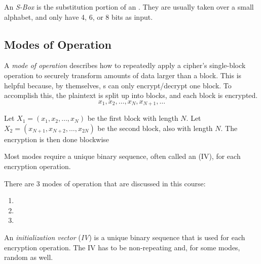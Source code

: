 \begin{definition}[S-Box]\label{def:S_Box}
  An \emph{S-Box} is the substitution portion of an .
  They are usually taken over a small alphabet, and only have 4, 6, or 8 bits as input.
\end{definition}

\subsection{Modes of Operation}\label{subsec:Modes_of_Operation}
\begin{definition}\label{def:Mode_of_Operation}
  A \emph{mode of operation} describes how to repeatedly apply a cipher's single-block operation to securely transform amounts of data larger than a block.
  This is helpful because, by themselves, s can only encrypt/decrypt one block.
  To accomplish this, the plaintext is split up into blocks, and each block is encrypted.
  \begin{equation*}
    x_{1}, x_{2}, \ldots, x_{N}, x_{N+1}, \ldots
  \end{equation*}

  Let $X_{1} = (x_{1}, x_{2}, \ldots, x_{N})$ be the first block with length $N$.
  Let $X_{2} = (x_{N+1}, x_{N+2}, \ldots, x_{2N})$ be the second block, also with length $N$.
  The encryption is then done blockwise
  
  Most modes require a unique binary sequence, often called an  (IV), for each encryption operation.

  There are 3 modes of operation that are discussed in this course:
  \begin{enumerate}[noitemsep]
  \item {}
  \item {}
  \item {}
  \end{enumerate}
\end{definition}

\begin{definition}\label{def:Initialization_Vector}
  An \emph{initialization vector} (\emph{IV}) is a unique binary sequence that is used for each encryption operation.
  The IV has to be non-repeating and, for some modes, random as well.
\end{definition}

